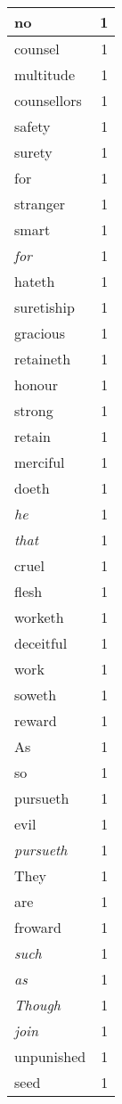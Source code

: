 \begin{center}
\begin{longtable}{l|r}
no & 1\\ \hline 
counsel & 1\\ \hline 
multitude & 1\\ \hline 
counsellors & 1\\ \hline 
safety & 1\\ \hline 
surety & 1\\ \hline 
for & 1\\ \hline 
stranger & 1\\ \hline 
smart & 1\\ \hline 
\emph{for} & 1\\ \hline 
hateth & 1\\ \hline 
suretiship & 1\\ \hline 
gracious & 1\\ \hline 
retaineth & 1\\ \hline 
honour & 1\\ \hline 
strong & 1\\ \hline 
retain & 1\\ \hline 
merciful & 1\\ \hline 
doeth & 1\\ \hline 
\emph{he} & 1\\ \hline 
\emph{that} & 1\\ \hline 
cruel & 1\\ \hline 
flesh & 1\\ \hline 
worketh & 1\\ \hline 
deceitful & 1\\ \hline 
work & 1\\ \hline 
soweth & 1\\ \hline 
reward & 1\\ \hline 
As & 1\\ \hline 
so & 1\\ \hline 
pursueth & 1\\ \hline 
evil & 1\\ \hline 
\emph{pursueth} & 1\\ \hline 
They & 1\\ \hline 
are & 1\\ \hline 
froward & 1\\ \hline 
\emph{such} & 1\\ \hline 
\emph{as} & 1\\ \hline 
\emph{Though} & 1\\ \hline 
\emph{join} & 1\\ \hline 
unpunished & 1\\ \hline 
seed & 1\\ \hline 

\end{longtable}
\end{center}
